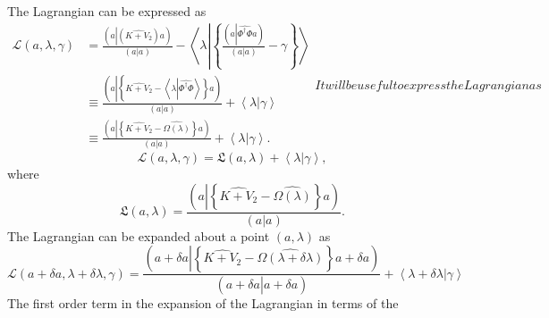 \documentclass[aps,preprint]{revtex4}%
\begin{document}
The Lagrangian can be expressed as
\begin{subequations}
\begin{align}
\mathcal{L}\left(  a,\lambda,\gamma\right)   &  =\frac{\left(  a\left\vert
\left(  \widehat{K+V_{2}}\right)  \right.  a\right)  }{\left(  a\left\vert
\overset{}{a}\right.  \right)  }-\left\langle \lambda\left\vert \left\{
\frac{\left(  a\left\vert \widehat{\Phi^{\dagger}\Phi}\right.  a\right)
}{\left(  a\left\vert \overset{}{a}\right.  \right)  }-\gamma\right\}
\right.  \right\rangle \nonumber\\
&  \equiv\frac{\left(  a\left\vert \left\{  \widehat{K+V_{2}}-\left\langle
\lambda\left\vert \widehat{\Phi^{\dagger}\Phi}\right.  \right\rangle \right\}
\right.  a\right)  }{\left(  a\left\vert \overset{}{a}\right.  \right)
}+\left\langle \lambda\left\vert \overset{}{\gamma}\right.  \right\rangle
\nonumber\\
&  \equiv\frac{\left(  a\left\vert \left\{  \widehat{K+V_{2}}-\widehat
{\Omega\left(  \lambda\right)  }\right\}  \right.  a\right)  }{\left(
a\left\vert \overset{}{a}\right.  \right)  }+\left\langle \lambda\left\vert
\overset{}{\gamma}\right.  \right\rangle .
\end{align}
It will be useful to express the Lagrangian as
\end{subequations}
\begin{equation}
\mathcal{L}\left(  a,\lambda,\gamma\right)  =\mathfrak{L}\left(
a,\lambda\right)  +\left\langle \lambda\left\vert \overset{}{\gamma}\right.
\right\rangle ,
\end{equation}
where
\begin{equation}
\mathfrak{L}\left(  a,\lambda\right)  =\frac{\left(  a\left\vert \left\{
\widehat{K+V_{2}}-\widehat{\Omega\left(  \lambda\right)  }\right\}  \right.
a\right)  }{\left(  a\left\vert \overset{}{a}\right.  \right)  }.
\end{equation}
The Lagrangian can be expanded about a point $\left(  a,\lambda\right)  $ as
\begin{equation}
\mathcal{L}\left(  a+\delta a,\lambda+\delta\lambda,\gamma\right)
=\frac{\left(  a+\delta a\left\vert \left\{  \widehat{K+V_{2}}-\widehat
{\Omega\left(  \lambda+\delta\lambda\right)  }\right\}  \right.  a+\delta
a\right)  }{\left(  a+\delta a\left\vert \overset{}{a+\delta a}\right.
\right)  }+\left\langle \lambda+\delta\lambda\left\vert \overset{}{\gamma
}\right.  \right\rangle
\end{equation}
The first order term in the expansion of the Lagrangian in terms of the
\end{document}
